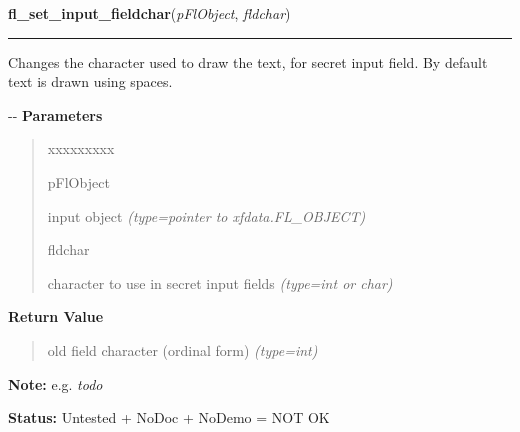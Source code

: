 \hspace{.8\funcindent}\begin{boxedminipage}{\funcwidth}

    \raggedright \textbf{fl\_set\_input\_fieldchar}(\textit{pFlObject}, \textit{fldchar})

    \vspace{-1.5ex}

    \rule{\textwidth}{0.5\fboxrule}
\setlength{\parskip}{2ex}

Changes the character used to draw the text, for secret input field. By
default text is drawn using spaces.

-{}-
\setlength{\parskip}{1ex}
      \textbf{Parameters}
      \vspace{-1ex}

      \begin{quote}
        \begin{Ventry}{xxxxxxxxx}

          \item[pFlObject]


input object
            {\it (type=pointer to xfdata.FL\_OBJECT)}

          \item[fldchar]


character to use in secret input fields
            {\it (type=int or char)}

        \end{Ventry}

      \end{quote}

      \textbf{Return Value}
    \vspace{-1ex}

      \begin{quote}

old field character (ordinal form)
      {\it (type=int)}

      \end{quote}

\textbf{Note:} 
e.g. \emph{todo}


\textbf{Status:} 
Untested + NoDoc + NoDemo = NOT OK


    \end{boxedminipage}

    \label{xformslib:flinput:fl_get_input_topline}

    \vspace{0.5ex}

